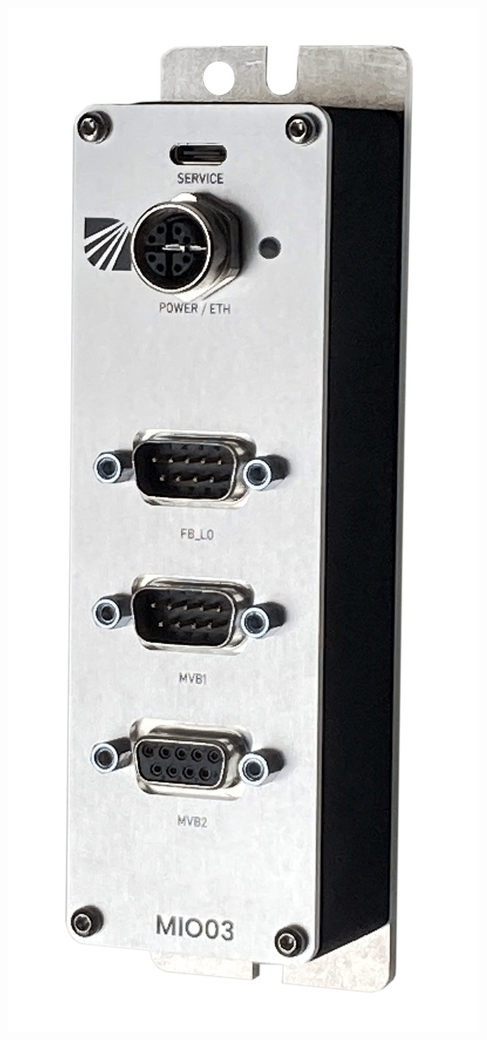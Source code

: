\begin{minipage}{0.4\textwidth}
  \includegraphics[width=0.7\linewidth]{Figures/Chap3/Konkurenz/CI4Rail.png}
  \label{fig:Ci4RailSniffer}
\end{minipage}
\hfill
